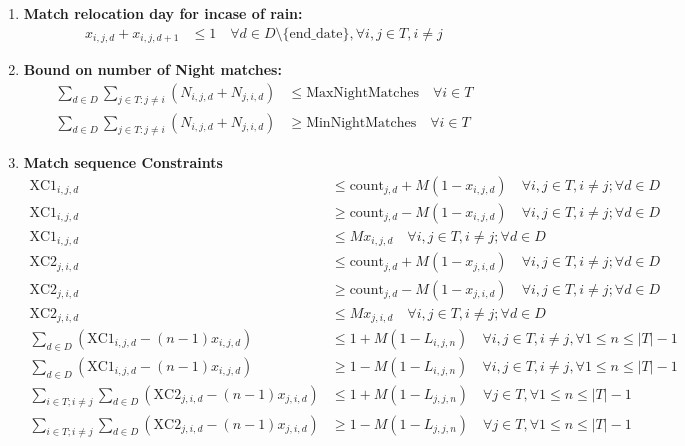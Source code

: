 \documentclass[a4paper, 12pt]{article}
\begin{document}
\begin{enumerate}
    \item \textbf{Match relocation day for incase of rain:}
    \begin{align*}
        x_{i,j,d} + x_{i,j,d+1} &\leq 1 \quad \forall d \in D \setminus \{ \text{end\_date} \}, \forall i,j \in T, i \neq j
    \end{align*}

    \item \textbf{Bound on number of Night matches:}
    \begin{align*}
        \sum_{d \in D} \sum_{j \in T : j \neq i} (N_{i,j,d} + N_{j,i,d}) &\leq \text{MaxNightMatches} \quad \forall i \in T\\
        \sum_{d \in D} \sum_{j \in T : j \neq i} (N_{i,j,d} + N_{j,i,d}) &\geq \text{MinNightMatches} \quad \forall i \in T
    \end{align*}

    \item \textbf{Match sequence Constraints}
    \begin{align*}
        \text{XC1}_{i,j,d} &\leq \text{count}_{j,d} + M(1 - x_{i,j,d}) \quad \forall i,j \in T, i \neq j ; \forall d \in D\\
        \text{XC1}_{i,j,d} &\geq \text{count}_{j,d} - M(1 - x_{i,j,d}) \quad \forall i,j \in T, i \neq j ; \forall d \in D\\
        \text{XC1}_{i,j,d} &\leq M x_{i,j,d} \quad \forall i,j \in T, i \neq j ; \forall d \in D\\
        \text{XC2}_{j,i,d} &\leq \text{count}_{j,d} + M(1 - x_{j,i,d}) \quad \forall i,j \in T, i \neq j ; \forall d \in D\\
        \text{XC2}_{j,i,d} &\geq \text{count}_{j,d} - M(1 - x_{j,i,d}) \quad \forall i,j \in T, i \neq j ; \forall d \in D\\
        \text{XC2}_{j,i,d} &\leq M x_{j,i,d} \quad \forall i,j \in T, i \neq j ; \forall d \in D\\
        \sum_{d \in D} (\text{XC1}_{i,j,d} - (n-1)x_{i,j,d}) &\leq 1 +  M(1 - L_{i,j,n}) \quad \forall i,j \in T, i \neq j, \forall 1 \leq n \leq |T| - 1\\
        \sum_{d \in D} (\text{XC1}_{i,j,d} - (n-1)x_{i,j,d}) &\geq 1 - M(1 - L_{i,j,n}) \quad \forall i,j \in T, i \neq j, \forall 1 \leq n \leq |T| - 1\\
        \sum_{i \in T; i \neq j} \sum_{d \in D} (\text{XC2}_{j,i,d} - (n-1)x_{j,i,d}) &\leq 1 + M(1 - L_{j,j,n}) \quad \forall j \in T,\forall 1 \leq n \leq |T| - 1\\
        \sum_{i \in T; i \neq j} \sum_{d \in D} (\text{XC2}_{j,i,d} - (n-1)x_{j,i,d}) &\geq 1 - M(1 - L_{j,j,n}) \quad \forall j \in T,\forall 1 \leq n \leq |T| - 1
    \end{align*}


\end{enumerate}
\end{document}
